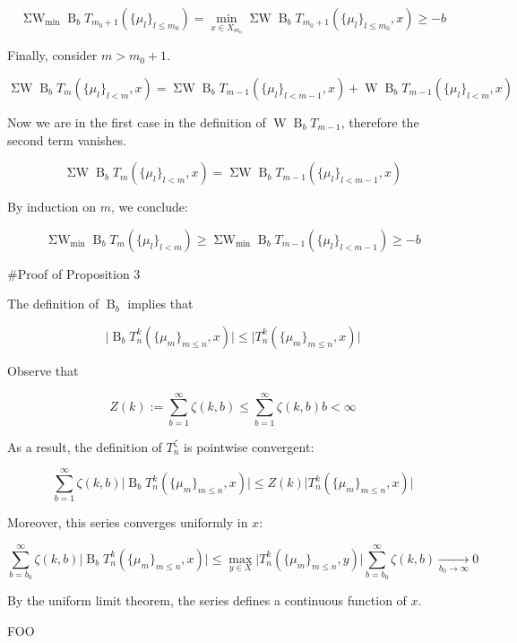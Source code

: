 \documentclass[a4paper]{article}
\newcommand{\Abs}[1]{\lvert #1 \rvert}
\newcommand{\B}{\operatorname{B}_b}
\newcommand{\W}{\operatorname{W}}
\newcommand{\SW}{\operatorname{\Sigma W}}
\newcommand{\SWm}{\operatorname{\Sigma W}_{\min}}
\begin{document}
$$\SWm \B T_{m_0+1}(\{\mu_l \}_{l \leq m_0}) = \min_{x \in X_{m_0}} \SW \B T_{m_0+1}(\{\mu_l \}_{l \leq m_0},x) \geq -b$$

Finally, consider ${m > m_0 + 1}$.

$$\SW \B T_{m}(\{\mu_l \}_{l < m},x) = \SW \B T_{m - 1}(\{\mu_l \}_{l < m - 1},x) + \W \B T_{m-1}(\{\mu_l \}_{l < m},x)$$

Now we are in the first case in the definition of ${\W \B T_{m-1}}$, therefore the second term vanishes.

$$\SW \B T_{m}(\{\mu_l \}_{l < m},x) = \SW \B T_{m - 1}(\{\mu_l \}_{l < m - 1},x)$$

By induction on ${m}$, we conclude:

$$\SWm \B T_{m}(\{\mu_l \}_{l < m}) \geq \SWm \B T_{m - 1}(\{\mu_l \}_{l < m - 1}) \geq -b$$

\#Proof of Proposition 3

The definition of ${\B}$ implies that

$$\Abs{\B T^k_n(\{\mu_m \}_{m \leq n},x)} \leq \Abs{T^k_n(\{\mu_m \}_{m \leq n},x)}$$

Observe that

$$Z(k):=\sum_{b=1}^\infty \zeta(k,b) \leq \sum_{b=1}^\infty \zeta(k,b)b < \infty$$

As a result, the definition of ${T^\zeta_n}$ is pointwise convergent:

$$ \sum_{b=1}^\infty \zeta(k,b) \Abs{\B T^k_n(\{\mu_m \}_{m \leq n},x)} \leq Z(k) \Abs{T^k_n(\{\mu_m \}_{m \leq n},x)}$$

Moreover, this series converges uniformly in ${x}$:

$$ \sum_{b=b_0}^\infty \zeta(k,b) \Abs{\B T^k_n(\{\mu_m \}_{m \leq n},x)} \leq \max_{y \in X} \Abs{T^k_n(\{\mu_m \}_{m \leq n},y)}\sum_{b=b_0}^\infty \zeta(k,b) \underset{b_0 \rightarrow \infty}{\rightarrow} 0$$

By the uniform limit theorem, the series defines a continuous function of ${x}$.

FOO
\end{document}
